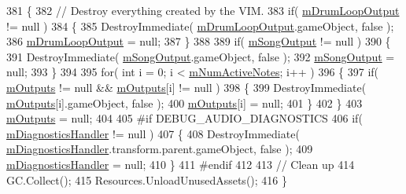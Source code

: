 \begin{DoxyCode}
381     \{
382         \textcolor{comment}{// Destroy everything created by the VIM.}
383         \textcolor{keywordflow}{if}( \hyperlink{group___v_i_m_priv_ga5f71cb71d240042312dcc13b481b068d}{mDrumLoopOutput} != null )
384         \{
385             DestroyImmediate( \hyperlink{group___v_i_m_priv_ga5f71cb71d240042312dcc13b481b068d}{mDrumLoopOutput}.gameObject, \textcolor{keyword}{false} );
386             \hyperlink{group___v_i_m_priv_ga5f71cb71d240042312dcc13b481b068d}{mDrumLoopOutput} = null;
387         \}
388 
389         \textcolor{keywordflow}{if}( \hyperlink{group___v_i_m_priv_gaa8d4f5642f5ac4dca4f4178b0052c78d}{mSongOutput} != null )
390         \{
391             DestroyImmediate( \hyperlink{group___v_i_m_priv_gaa8d4f5642f5ac4dca4f4178b0052c78d}{mSongOutput}.gameObject, \textcolor{keyword}{false} );
392             \hyperlink{group___v_i_m_priv_gaa8d4f5642f5ac4dca4f4178b0052c78d}{mSongOutput} = null;
393         \}
394 
395         \textcolor{keywordflow}{for}( \textcolor{keywordtype}{int} i = 0; i < \hyperlink{group___v_i_m_priv_ga0f7e11945763c48057be326b661dfdaf}{mNumActiveNotes}; i++ )
396         \{
397             \textcolor{keywordflow}{if}( \hyperlink{group___v_i_m_priv_ga53f837fd01475fa35629a650e7fa00e3}{mOutputs} != null && \hyperlink{group___v_i_m_priv_ga53f837fd01475fa35629a650e7fa00e3}{mOutputs}[i] != null )
398             \{
399                 DestroyImmediate( \hyperlink{group___v_i_m_priv_ga53f837fd01475fa35629a650e7fa00e3}{mOutputs}[i].gameObject, \textcolor{keyword}{false} );
400                 \hyperlink{group___v_i_m_priv_ga53f837fd01475fa35629a650e7fa00e3}{mOutputs}[i] = null;
401             \}
402         \}
403         \hyperlink{group___v_i_m_priv_ga53f837fd01475fa35629a650e7fa00e3}{mOutputs} = null;
404 
405 \textcolor{preprocessor}{        #if DEBUG\_AUDIO\_DIAGNOSTICS}
406             \textcolor{keywordflow}{if}( \hyperlink{group___v_i_m_priv_gafabe4a874fc21f7bcedf431df3b94201}{mDiagnosticsHandler} != null )
407             \{
408                 DestroyImmediate( \hyperlink{group___v_i_m_priv_gafabe4a874fc21f7bcedf431df3b94201}{mDiagnosticsHandler}.transform.parent.gameObject, \textcolor{keyword}{false}
       );
409                 \hyperlink{group___v_i_m_priv_gafabe4a874fc21f7bcedf431df3b94201}{mDiagnosticsHandler} = null;
410             \}
411 \textcolor{preprocessor}{        #endif}
412 
413         \textcolor{comment}{// Clean up}
414         GC.Collect();
415         Resources.UnloadUnusedAssets();
416     \}
\end{DoxyCode}

